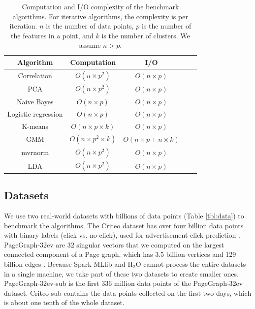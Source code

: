 \begin{table}
\begin{center}
\caption{Computation and I/O complexity of the benchmark algorithms. For
	iterative algorithms, the complexity is per iteration. $n$ is the number
	of data points, $p$ is the number of the features in a point, and $k$ is
	the number of clusters. We assume $n > p$.
}
\vspace{-10pt}
\footnotesize
\begin{tabular}{|c|c|c|c|c|}
\hline
Algorithm & Computation & I/O \\
\hline
Correlation & $O(n \times p^2)$ & $O(n \times p)$ \\
\hline
PCA & $O(n \times p^2)$ & $O(n \times p)$ \\
\hline
Naive Bayes & $O(n \times p)$ & $O(n \times p)$ \\
\hline
Logistic regression & $O(n \times p)$ & $O(n \times p)$ \\
\hline
K-means & $O(n \times p \times k)$ & $O(n \times p)$ \\
\hline
GMM & $O(n \times p^2 \times k)$ & $O(n \times p + n \times k)$ \\
\hline
mvrnorm & $O(n \times p^2)$ & $O(n \times p)$ \\
\hline
LDA & $O(n \times p^2)$ & $O(n \times p)$ \\
\hline
\end{tabular}
\normalsize
\label{tbl:algs}
\end{center}
\vspace{-10pt}
\end{table}

\subsection{Datasets}\label{sec:data}
We use two real-world datasets with billions of data points (Table \ref{tbl:data})
to benchmark the algorithms. The Criteo dataset has over four billion data
points with binary labels (click vs. no-click), used for advertisement click
prediction \cite{criteo}. PageGraph-32ev are 32 singular vectors that we computed
on the largest connected component of a Page graph, which has 3.5 billion vertices and
129 billion edges \cite{webgraph}. Because Spark MLlib and H$_2$O cannot process
the entire datasets in a single machine, we take part of these two datasets
to create smaller ones.
PageGraph-32ev-sub is the first 336 million data points
of the PageGraph-32ev dataset. Criteo-sub contains the data points collected
on the first two days, which is about one tenth of the whole dataset.

